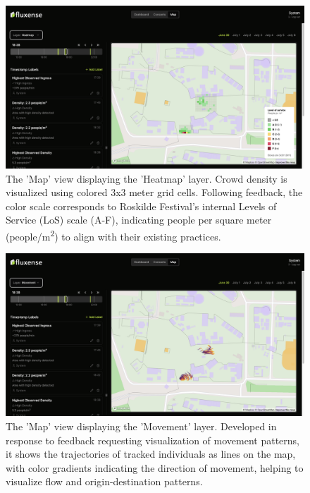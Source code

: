 \begin{figure}[H]
  \centering
  \includegraphics[width=\textwidth]{Pictures/Misc/Frontend/map_density.png}
  \caption{The 'Map' view displaying the 'Heatmap' layer. Crowd density is visualized using colored 3x3 meter grid cells. Following feedback, the color scale corresponds to Roskilde Festival's internal Levels of Service (LoS) scale (A-F), indicating people per square meter (people/m\textsuperscript{2}) to align with their existing practices.}
  \label{fig:showcase:map-density}

\end{figure}

\begin{figure}[H]
  \centering
  \includegraphics[width=\textwidth]{Pictures/Misc/Frontend/map_movement.png}
  \caption{The 'Map' view displaying the 'Movement' layer. Developed in response to feedback requesting visualization of movement patterns, it shows the trajectories of tracked individuals as lines on the map, with color gradients indicating the direction of movement, helping to visualize flow and origin-destination patterns.}
  \label{fig:showcase:map-movement}

\end{figure}


